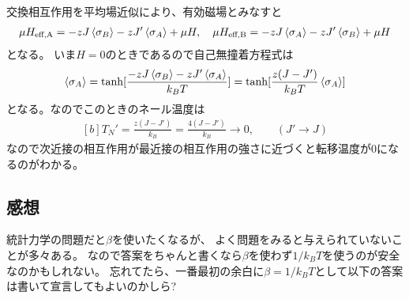 \documentclass[../../sp_2016.tex]{subfiles}
\begin{document}
\subsection{}
交換相互作用を平均場近似により、有効磁場とみなすと
\begin{equation}\begin{aligned}[b]
    \mu H_{\text{eff,A}} = -zJ\ev{\sigma_B}-zJ'\ev{\sigma_A}+\mu H,\quad
    \mu H_{\text{eff,B}} = -zJ\ev{\sigma_A}-zJ'\ev{\sigma_B}+\mu H
\end{aligned}\end{equation}
となる。
いま\(H=0\)のときであるので自己無撞着方程式は
\begin{equation}\begin{aligned}[b]
    \ev{\sigma_A} = \tanh[\frac{-zJ\ev{\sigma_B}-zJ'\ev{\sigma_A}}{k_BT}] = \tanh[\frac{z(J-J')}{k_BT}\ev{\sigma_A}]
\end{aligned}\end{equation}
となる。なのでこのときのネール温度は
\begin{equation}\begin{aligned}[b]
    T_N' = \frac{z(J-J')}{k_B}= \frac{4(J-J')}{k_B} \to 0, \qquad (J'\to J)
\end{aligned}\end{equation}
なので次近接の相互作用が最近接の相互作用の強さに近づくと転移温度が0になるのがわかる。

\subsection*{感想}
統計力学の問題だと\(\beta\)を使いたくなるが、
よく問題をみると与えられていないことが多々ある。
なので答案をちゃんと書くなら\(\beta\)を使わず\(1/k_BT\)を使うのが安全なのかもしれない。
忘れてたら、一番最初の余白に\(\beta=1/k_BT\)として以下の答案は書いて宣言してもよいのかしら?
\end{document}
